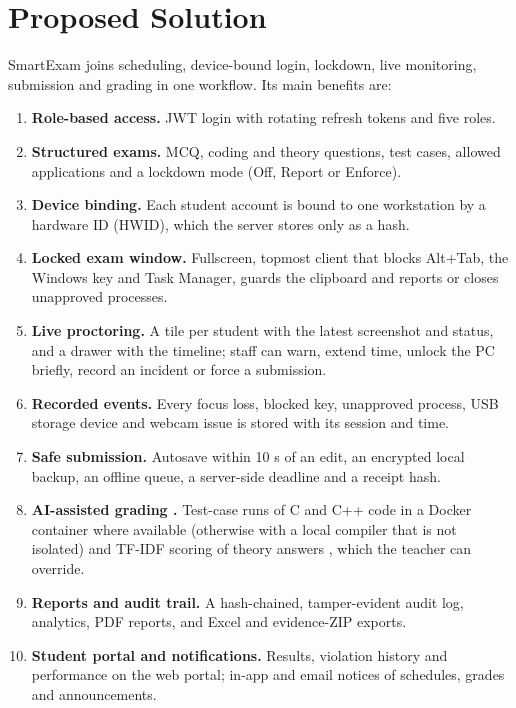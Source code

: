 \section{Proposed Solution}

SmartExam joins scheduling, device-bound login, lockdown, live monitoring, submission and grading in one workflow. Its main benefits are:

\begin{enumerate}[noitemsep]
\item \textbf{Role-based access.} JWT login \cite{rfc7519} with rotating refresh tokens \cite{rfc9700} and five roles.
\item \textbf{Structured exams.} MCQ, coding and theory questions, test cases, allowed applications and a lockdown mode (Off, Report or Enforce).
\item \textbf{Device binding.} Each student account is bound to one workstation by a hardware ID (HWID), which the server stores only as a hash.
\item \textbf{Locked exam window.} Fullscreen, topmost client that blocks Alt+Tab, the Windows key and Task Manager, guards the clipboard and reports or closes unapproved processes.
\item \textbf{Live proctoring.} A tile per student with the latest screenshot and status, and a drawer with the timeline; staff can warn, extend time, unlock the PC briefly, record an incident or force a submission.
\item \textbf{Recorded events.} Every focus loss, blocked key, unapproved process, USB storage device and webcam issue is stored with its session and time.
\item \textbf{Safe submission.} Autosave within 10 s of an edit, an encrypted local backup, an offline queue, a server-side deadline and a receipt hash.
\item \textbf{AI-assisted grading \cite{eassess1}.} Test-case runs \cite{alamutka2005} of C and C++ code in a Docker container where available (otherwise with a local compiler that is not isolated) and TF-IDF scoring of theory answers \cite{salton1988}, which the teacher can override.
\item \textbf{Reports and audit trail.} A hash-chained, tamper-evident audit log, analytics, PDF reports, and Excel and evidence-ZIP exports.
\item \textbf{Student portal and notifications.} Results, violation history and performance on the web portal; in-app and email notices of schedules, grades and announcements.
\end{enumerate}
